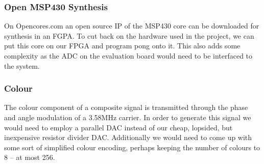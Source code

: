 \subsubsection*{Open MSP430 Synthesis}

On Opencores.com an open source IP of the MSP430 core can be downloaded for
synthesis in an FGPA. To cut back on the hardware used in the project, we can
put this core on our FPGA and program pong onto it. This also adds some
complexity as the ADC on the evaluation board would need to be interfaced to the
system.

\subsubsection*{Colour}

The colour component of a composite signal is transmitted through the phase and
angle modulation of a 3.58MHz carrier. In order to generate this signal we would
need to employ a parallel DAC instead of our cheap, lopsided, but inexpensive
resistor divider DAC. Additionally we would need to come up with some sort of
simplified colour encoding, perhaps keeping the number of colours to 8 -- at
most 256.
